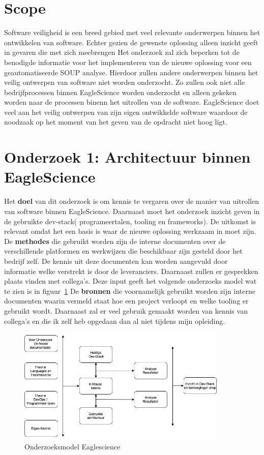 \section{Scope}\label{sec:Scope}
Software veiligheid is een breed gebied met veel relevante onderwerpen binnen het ontwikkelen van software. Echter gezien de gewenste oplossing alleen inzicht geeft in gevaren die met zich meebrengen
Het onderzoek zal zich beperken tot de benodigde informatie voor het implementeren van de nieuwe oplossing voor een geautomatiseerde SOUP analyse. Hierdoor zullen andere onderwerpen binnen het veilig ontwerpen van software niet worden onderzocht. Zo zullen ook niet alle bedrijfprocessen binnen EagleScience worden onderzocht en alleen gekeken worden naar de processen binenn het uitrollen van de software. EagleScience doet veel aan het veilig ontwerpen van zijn eigen ontwikkelde software waardoor de noodzaak op het moment van het geven van de opdracht niet hoog ligt.


\section{Onderzoek 1: Architectuur binnen EagleScience}\label{sec:onderzoeksmethode-architectuur-binnen-eaglescience}
Het \textbf{doel} van dit onderzoek is om kennis te vergaren over de manier van uitrollen van software binnen EagleScience. Daarnaast moet het onderzoek inzicht geven in de gebruikte dev-stack( programeertalen, tooling en frameworks). De uitkomst is relevant omdat het een basis is waar de nieuwe oplossing werkzaam in moet zijn. De \textbf{methodes} die gebruikt worden zijn de interne documenten over de verschillende platformen en werkwijzen die beschikbaar zijn gesteld door het bedrijf zelf. De kennis uit deze documenten kan worden aangevuld door informatie welke verstrekt is door de leveranciers. Daarnaast zullen er gesprekken plaats vinden met collega's. Deze input geeft het volgende onderzoeks model wat te zien is in figuur~\ref{fig:OnderzoeksModelEaglescience}
De \textbf{bronnen} die voornamelijk gebruikt worden zijn interne documenten waarin vermeld staat hoe een project verloopt en welke tooling er gebruikt wordt. Daarnaast zal er veel gebruik gemaakt worden van kennis van collega's en die ik zelf heb opgedaan dan al niet tijdens mijn opleiding.
\begin{figure}[htbp] %
    \myfloatalign
    \includegraphics[width=10cm]{gfx/OnderzoeksmodelES}
    \caption{Onderzoeksmodel Eaglescience}
    \label{fig:OnderzoeksModelEaglescience}
\end{figure}


